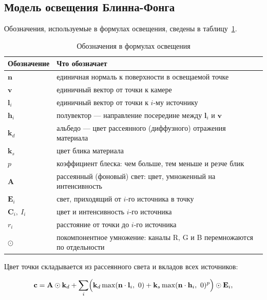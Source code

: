 \documentclass[14pt,a4paper]{extarticle}
\begin{document}
\subsection{Модель освещения Блинна-Фонга}

Обозначения, используемые в формулах освещения, сведены в
таблицу~\ref{tab:light}.

\begin{table}[!htb]
	\caption{Обозначения в формулах освещения}
	\label{tab:light}
	\centering
	\vspace{2mm}
	\begin{tabular}{@{}l p{}@{}}
		\toprule
		Обозначение & Что обозначает \\
		\midrule
		$\mathbf{n}$ & единичная нормаль к поверхности в освещаемой точке \\
		$\mathbf{v}$ & единичный вектор от точки к камере \\
		$\mathbf{l}_i$ & единичный вектор от точки к $i$-му источнику \\
		$\mathbf{h}_i$ & полувектор — направление посередине между $\mathbf{l}_i$ и $\mathbf{v}$ \\
		\addlinespace
		$\mathbf{k}_d$ & альбедо — цвет рассеянного (диффузного) отражения материала \\
		$\mathbf{k}_s$ & цвет блика материала \\
		$p$ & коэффициент блеска: чем больше, тем меньше и резче блик \\
		\addlinespace
		$\mathbf{A}$ & рассеянный (фоновый) свет: цвет, умноженный на интенсивность \\
		$\mathbf{E}_i$ & свет, приходящий от $i$-го источника в точку \\
		$\mathbf{C}_i,\ I_i$ & цвет и интенсивность $i$-го источника \\
		$r_i$ & расстояние от точки до $i$-го источника \\
		\addlinespace
		$\odot$ & покомпонентное умножение: каналы R, G и B перемножаются по отдельности \\
		\bottomrule
	\end{tabular}
\end{table}

Цвет точки складывается из рассеянного света и вкладов всех источников:

\begin{equation}
	\mathbf{c} = \mathbf{A} \odot \mathbf{k}_d
	+ \sum_i \Bigl(
		\mathbf{k}_d \max(\mathbf{n} \cdot \mathbf{l}_i,\ 0)
		+ \mathbf{k}_s \max(\mathbf{n} \cdot \mathbf{h}_i,\ 0)^{p}
	\Bigr) \odot \mathbf{E}_i,
	\label{eq:blinn}
\end{equation}
\end{document}
